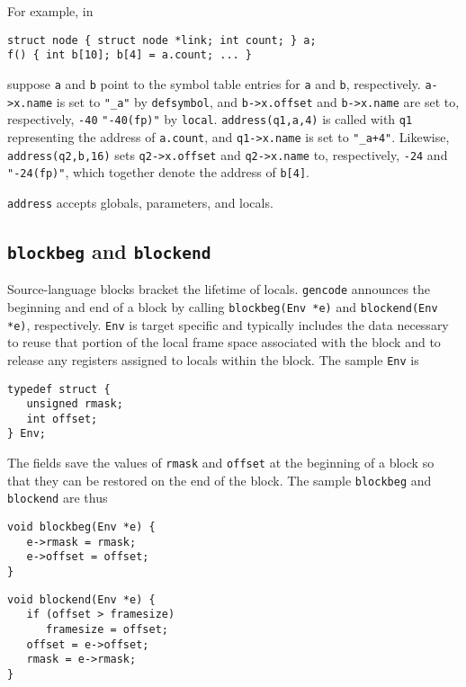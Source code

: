 For example, in
\begin{verbatim}
struct node { struct node *link; int count; } a;
f() { int b[10]; b[4] = a.count; ... }
\end{verbatim}
suppose \verb|a| and \verb|b| point to the symbol table entries
for \verb|a| and \verb|b|, respectively.
\verb|a->x.name| is set to \verb|"_a"| by \verb|defsymbol|, and
\verb|b->x.offset| and \verb|b->x.name| are set to, respectively,
\verb|-40| \verb|"-40(fp)"| by \verb|local|.
\verb|address(q1,a,4)| is called with \verb|q1| representing the address
of \verb|a.count|, and \verb|q1->x.name| is set to \verb|"_a+4"|.
Likewise, \verb|address(q2,b,16)| sets \verb|q2->x.offset|
and \verb|q2->x.name| to, respectively, \verb|-24| and \verb|"-24(fp)"|,
which together denote the address of \verb|b[4]|.

\verb|address| accepts globals, parameters, and locals.

\subsection{{\tt blockbeg} and \tt blockend}

\label{blockbeg}\label{blockend}
Source-language blocks bracket the lifetime of locals.
\verb|gencode| announces the beginning and end of a block
by calling \verb|blockbeg(Env *e)| and \verb|blockend(Env *e)|, respectively.
\verb|Env| is target specific and typically includes
the data necessary to reuse that portion of the local frame
space associated with the block
and to release any registers assigned to locals within the block.
The sample \verb|Env| is
\begin{verbatim}
typedef struct {
   unsigned rmask;
   int offset;
} Env;
\end{verbatim}
The fields save the values of \verb|rmask| and \verb|offset| at the beginning
of a block so that they can be restored on the end of the block.
The sample \verb|blockbeg| and \verb|blockend| are thus

\noindent
\begin{minipage}[t]{.5\textwidth}
\vspace{\parskip}
\begin{verbatim}
void blockbeg(Env *e) {
   e->rmask = rmask;
   e->offset = offset;
}
\end{verbatim}
\vspace{\parskip}
\end{minipage}
\begin{minipage}[t]{.5\textwidth}
\vspace{\parskip}
\begin{verbatim}
void blockend(Env *e) {
   if (offset > framesize)
      framesize = offset;
   offset = e->offset;
   rmask = e->rmask;
}
\end{verbatim}
\vspace{\parskip}
\end{minipage}


